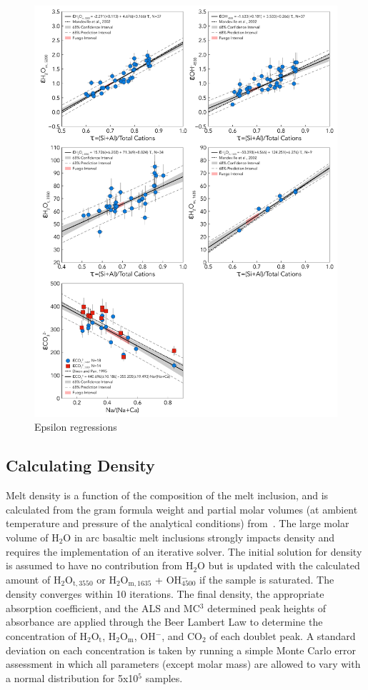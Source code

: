 \documentclass[draft]{agujournal2019}
\begin{document}
\begin{figure}[htb!] 
\centering
\includegraphics[width=1.0\textwidth]{AllEpsilonRegress}
\caption[Epsilon Regressions]{Epsilon regressions}
\label{figure:EpsilonRegressions}
\end{figure}


\subsection{Calculating Density}
Melt density is a function of the composition of the melt inclusion, and is calculated from the gram formula weight and partial molar volumes (at ambient temperature and pressure of the analytical conditions) from~. The large molar volume of H$_{2}$O in arc basaltic melt inclusions strongly impacts density and requires the implementation of an iterative solver. The initial solution for density is assumed to have no contribution from H$_{2}$O but is updated with the calculated amount of H$_{2}$O$_{\mathrm{t, 3550}}$ or H$_{2}$O$_{\mathrm{m, 1635}}$ + OH$^{-}_{4500}$ if the sample is saturated. The density converges within 10 iterations. The final density, the appropriate absorption coefficient, and the ALS and MC$^3$ determined peak heights of absorbance are applied through the Beer Lambert Law to determine the concentration of H$_{2}$O$_{\mathrm{t}}$, H$_{2}$O$_{\mathrm{m}}$, OH$^{-}$, and CO$_{2}$ of each doublet peak. A standard deviation on each concentration is taken by running a simple Monte Carlo error assessment in which all parameters (except molar mass) are allowed to vary with a normal distribution for 5x10$^{5}$ samples.
\end{document}
